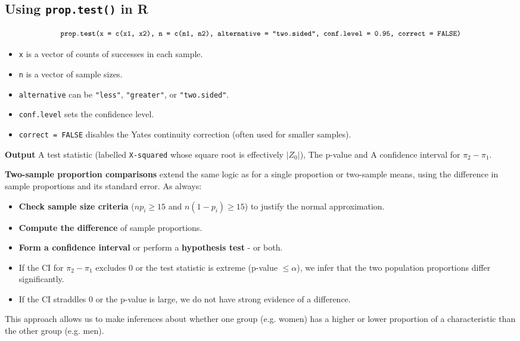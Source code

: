 \documentclass[10pt, total={6in, 8in}]{extarticle}
\begin{document}
\subsection{Using \texttt{prop.test()} in R}
$$\small\texttt{prop.test(x = c(x1, x2), n = c(n1, n2), alternative = "two.sided", conf.level = 0.95, correct = FALSE)}$$

\begin{itemize}
    \item \texttt{x} is a vector of counts of successes in each sample.
    \item \texttt{n} is a vector of sample sizes.
    \item \texttt{alternative} can be \texttt{"less"}, \texttt{"greater"}, or \texttt{"two.sided"}.
    \item \texttt{conf.level} sets the confidence level.
    \item \texttt{correct = FALSE} disables the Yates continuity correction (often used for smaller samples).
\end{itemize}

\textbf{Output} A test statistic (labelled \texttt{X-squared} whose square root is effectively $\lvert Z_0\rvert$), The p-value and A confidence interval for $\pi_2 - \pi_1$.

\begin{takeaway-box}{}{}
\small
\textbf{Two-sample proportion comparisons} extend the same logic as for a single proportion or two-sample means, using the difference in sample proportions and its standard error. As always:
\begin{itemize}
    \item \textbf{Check sample size criteria} ($n p_i \ge 15$ and $n (1-p_i) \ge 15$) to justify the normal approximation.
    \item \textbf{Compute the difference} of sample proportions.
    \item \textbf{Form a confidence interval} or perform a \textbf{hypothesis test} - or both.
    \item If the CI for $\pi_2 - \pi_1$ excludes 0 or the test statistic is extreme (p-value $\le \alpha$), we infer that the two population proportions differ significantly.
    \item If the CI straddles 0 or the p-value is large, we do not have strong evidence of a difference.
\end{itemize}
This approach allows us to make inferences about whether one group (e.g. women) has a higher or lower proportion of a characteristic than the other group (e.g. men).
\end{takeaway-box}
\end{document}
